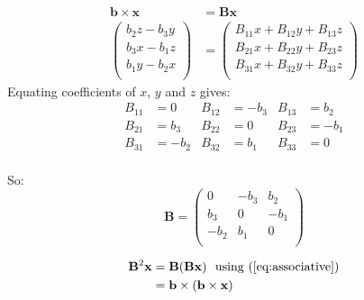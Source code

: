 \documentclass[10pt,oneside,a4paper]{article}
\begin{document}
\begin{enumerate}
\[
\begin{split}
\mathbf{b} \times \mathbf{x} &= \mathbf{B}\mathbf{x} \\
\begin{pmatrix} b_2 z - b_3 y \\ b_3 x - b_1 z \\ b_1 y - b_2 x \\ \end{pmatrix} &= \begin{pmatrix} B_{11}x + B_{12}y +
B_{13}z \\ B_{21}x + B_{22}y + B_{23}z \\ B_{31}x + B_{32}y + B_{33}z \\ \end{pmatrix}
\end{split}
\]
Equating coefficients of $x$, $y$ and $z$ gives:
\begin{align*}
B_{11} &= 0 & B_{12} &= -b_3 & B_{13} &= b_2 \\
B_{21} &= b_3 & B_{22} &= 0 & B_{23} &= -b_1 \\
B_{31} &= -b_2 & B_{32} &= b_1 & B_{33} &= 0 \\
\end{align*}

So:
\[
\mathbf{B} = \begin{pmatrix} 0 & -b_3 & b_2 \\ b_3 & 0 & -b_1 \\ -b_2 & b_1 & 0 \\ \end{pmatrix}
\]

\[
\begin{split}
\mathbf{B}^2\mathbf{x} &= \mathbf{B}(\mathbf{B}\mathbf{x})~\text{ using (\ref{eq:associative})}\\
                       &= \mathbf{b} \times (\mathbf{b} \times \mathbf{x}) \\
\end{split}
\]


\end{enumerate}
\end{document}
